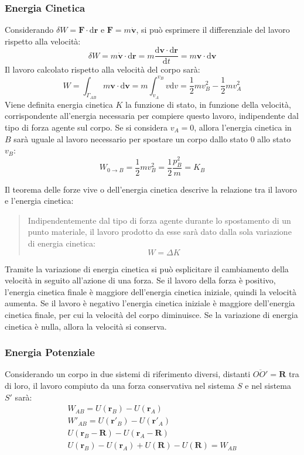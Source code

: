 \documentclass{article}
\newcommand{\vect}[1]{\boldsymbol{\mathbf{#1}}}
\newcommand{\df}{\mathrm{d}}
\numberwithin{equation}{subsection}
\begin{document}
\subsubsection{Energia Cinetica}
Considerando $\delta W=\vect{F}\cdot \df\vect{r}$ e $\vect{F}=m\dot{\vect{v}}$, si può esprimere il differenziale del lavoro rispetto alla velocità:
\begin{equation*}
    \delta W=m\dot{\vect{v}}\cdot \df\vect{r}=m\displaystyle\frac{\df\vect{v}\cdot \df\vect{r}}{\df t}=m\vect{v}\cdot \df\vect{v}
\end{equation*}
Il lavoro calcolato rispetto alla velocità del corpo sarà:
\begin{equation*}
    W=\int_{\Gamma_{AB}}m\vect{v}\cdot \df\vect{v}=m\int_{v_A}^{v_B}v\df v=\displaystyle\frac{1}{2}mv_B^2-\frac{1}{2}mv_A^2
\end{equation*}
Viene definita energia cinetica $K$ la funzione di stato, in funzione della velocità, corrispondente all'energia necessaria per compiere questo 
lavoro, indipendente dal tipo di forza agente sul corpo. Se si 
considera $v_A=0$, allora l'energia cinetica in $B$ sarà uguale al 
lavoro necessario per spostare un corpo dallo stato $0$ allo stato $v_B$:
\begin{equation}
    W_{0\to B}=\displaystyle\frac{1}{2}mv_B^{2}=\frac{1}{2}\frac{p^2_B}{m}=K_B
\end{equation}


Il teorema delle forze vive o dell'energia cinetica descrive la relazione tra il lavoro e l'energia cinetica: 
\begin{quotation}
    Indipendentemente dal tipo di forza agente durante lo spostamento di un punto materiale, il lavoro
    prodotto da esse sarà dato dalla sola variazione di energia cinetica:
    \begin{equation}
        W=\Delta K
    \end{equation}
\end{quotation}  
Tramite la variazione di energia cinetica si può esplicitare il cambiamento della velocità in seguito all'azione di una forza. Se il lavoro della forza è positivo, l'energia 
cinetica finale è maggiore dell'energia cinetica iniziale, quindi la velocità aumenta. Se il lavoro è negativo l'energia cinetica iniziale è maggiore dell'energia cinetica 
finale, per cui la velocità del corpo diminuisce. Se la variazione di energia cinetica è nulla, allora la velocità si conserva. 

\subsubsection{Energia Potenziale}
Considerando un corpo in due sistemi di riferimento diversi, distanti 
$\overline{OO'}=\vect{R}$ tra di loro, il lavoro compiuto da una forza 
conservativa nel sistema $S$ e nel sistema $S'$ sarà:
\begin{gather*}
    W_{AB}=U(\vect{r}_B)-U(\vect{r}_A)\\
    W'_{AB}=U(\vect{r}'_B)-U(\vect{r}'_A)\\
    U(\vect{r}_B-\vect{R})-U(\vect{r}_A-\vect{R})\\
    U(\vect{r}_B)-U(\vect{r}_A)+U(\vect{R})-U(\vect{R})=W_{AB}
\end{gather*}
\end{document}
